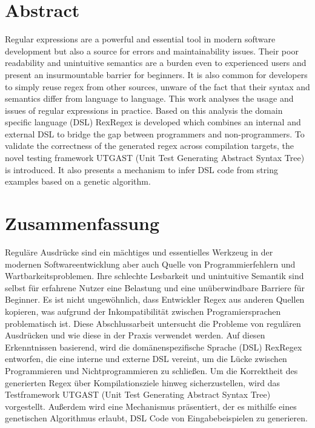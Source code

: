 \section*{Abstract}

Regular expressions are a powerful and essential tool in modern software development but also a source for errors and maintainability issues. Their poor readability and unintuitive semantics are a burden even to experienced users and present an insurmountable barrier for beginners. It is also common for developers to simply reuse regex from other sources, unware of the fact that their syntax and semantics differ from language to language. This work analyses the usage and issues of regular expressions in practice. Based on this analysis the domain specific language (DSL) RexRegex is developed which combines an internal and external DSL to bridge the gap between programmers and non-programmers. To validate the correctness of the generated regex across compilation targets, the novel testing framework UTGAST (Unit Test Generating Abstract Syntax Tree) is introduced. It also presents a mechanism to infer DSL code from string examples based on a genetic algorithm.


\section*{Zusammenfassung}

Reguläre Ausdrücke sind ein mächtiges und essentielles Werkzeug in der modernen Softwareentwicklung aber auch Quelle von Programmierfehlern und Wartbarkeitsproblemen. Ihre schlechte Lesbarkeit und unintuitive Semantik sind selbst für erfahrene Nutzer eine Belastung und eine unüberwindbare Barriere für Beginner. Es ist nicht ungewöhnlich, dass Entwickler Regex aus anderen Quellen kopieren, was aufgrund der Inkompatibilität zwischen Programiersprachen problematisch ist. Diese Abschlussarbeit untersucht die Probleme von regulären Ausdrücken und wie diese in der Praxis verwendet werden. Auf diesen Erkenntnissen basierend, wird die domänenspezifische Sprache (DSL) RexRegex entworfen, die eine interne und externe DSL vereint, um die Lücke zwischen Programmieren und Nichtprogrammieren zu schließen. Um die Korrektheit des generierten Regex über Kompilationsziele hinweg sicherzustellen, wird das Testframework UTGAST (Unit Test Generating Abstract Syntax Tree) vorgestellt. Außerdem wird eine Mechanismus präsentiert, der es mithilfe eines genetischen Algorithmus erlaubt, DSL Code von Eingabebeispielen zu generieren.
